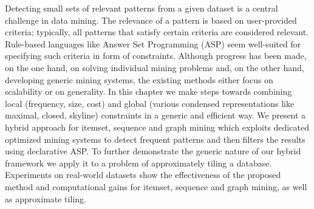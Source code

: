   Detecting small sets of relevant patterns from a given dataset is a central challenge in data mining. The relevance of a pattern is based on user-provided criteria; typically, all patterns that satisfy certain criteria are considered relevant. Rule-based languages like Answer Set Programming (ASP) seem well-suited for specifying such criteria in form of constraints.  Although progress has been made, on the one hand, on solving individual mining problems and, on the other hand, developing generic mining systems, the existing methods either focus on scalability or on generality.  In this chapter we make steps towards combining local (frequency, size, cost) and global (various condensed representations like maximal, closed, skyline) constraints in a generic and efficient way. We present a hybrid approach for itemset, sequence and graph mining which exploits dedicated optimized mining systems to detect frequent patterns and then filters the results using declarative ASP. To further demonstrate the generic nature of our hybrid framework we apply it to a problem of approximately tiling a database. Experiments on real-world datasets show the effectiveness of the proposed method and computational gains 
for itemset, sequence and graph mining, as well as approximate tiling. 
